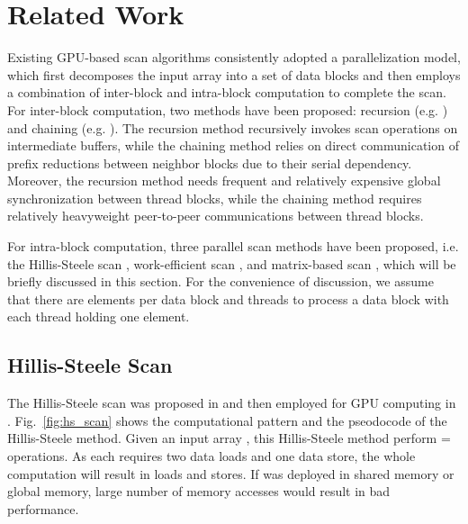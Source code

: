 \documentclass[article]{elsarticle}
\begin{document}
{\section{Related Work}
\label{sec:related_work}
Existing GPU-based scan algorithms consistently adopted a parallelization model, which first decomposes the input array  into a set of data blocks and then employs a combination of inter-block and intra-block computation to complete the scan. For inter-block computation, two methods have been proposed: recursion (e.g. \cite{dotsenko2008fast}) and chaining (e.g. \cite{yan2013streamscan}). The recursion method recursively invokes scan operations on intermediate buffers, while the chaining method relies on direct communication of prefix reductions between neighbor blocks due to their serial dependency. Moreover, the recursion method needs frequent and relatively expensive global synchronization between thread blocks, while the chaining method requires relatively heavyweight peer-to-peer communications between thread blocks.

For intra-block computation, three parallel scan methods have been proposed, i.e. the Hillis-Steele scan \cite{hillis1986data}, work-efficient scan \cite{harris2007parallel}, and matrix-based scan \cite{dotsenko2008fast}, which will be briefly discussed in this section. For the convenience of discussion, we assume that there are  elements per data block and  threads to process a data block with each thread holding one element.
\subsection{Hillis-Steele Scan}
\label{sec:hs_scan}
The Hillis-Steele scan was proposed in \cite{hillis1986data} and then employed for GPU computing in \cite{horn2005stream}. Fig.~\ref{fig:hs_scan} shows the computational pattern and the pseodocode of the Hillis-Steele method. Given an input array , this Hillis-Steele method perform \mbox{} = \mbox{}  operations. As each  requires two data loads and one data store, the whole computation will result in \mbox{} loads and \mbox{} stores. If  was deployed in shared memory or global memory, large number of memory accesses would result in bad performance.
\newcommand{\hsscankernel}{
\begin{algorithmic}[1]
\fontsize{8pt}{8.05pt}\selectfont
\Procedure{Hillis\_Steele\_scan}{, , }
    \For{=0; ; ++}
    	\ForAll{ in parallel}
        	\If{}
            	\State  = ;
            \EndIf
        \EndFor
    \EndFor
\EndProcedure
\end{algorithmic}}

}
\end{document}
